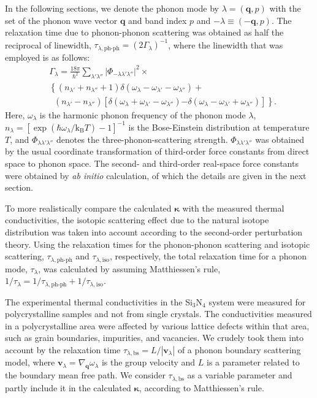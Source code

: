 \documentclass[twocolumn,amsmath,amssymb,a4paper,prb,superscriptaddress,floatfix]{revtex4-1}
\begin{document}
In the following sections, we denote the phonon mode by $\lambda=(\mathbf{q},p)$
with the set of the phonon wave vector $\mathbf{q}$ and band index $p$ and
$-\lambda \equiv (-\mathbf{q},p)$. The relaxation time due to phonon-phonon
scattering was obtained as half the reciprocal of linewidth,
$\tau_{\lambda,\text{ph-ph}}=(2\Gamma_\lambda)^{-1}$, where the linewidth that was
employed is as follows:
\begin{align}
 \label{eq:linewidth}
 &\Gamma_\lambda = \frac{18\pi}{\hbar^2}
  \sum_{\lambda' \lambda''}
  \bigl|\Phi_{-\lambda\lambda'\lambda''}\bigl|^2 \times \nonumber \\ 
 &\left\{ (n_{\lambda'} + n_{\lambda''}+1) 
   \delta(\omega_\lambda-\omega_{\lambda'}-\omega_{\lambda''}) \right.
   + \nonumber \\ 
 &\;\;(n_{\lambda'}-n_{\lambda''})
  \left[\delta(\omega_\lambda +\omega_{\lambda'}-\omega_{\lambda''})
 \right. 
 \left. -\left. \delta(\omega_\lambda - \omega_{\lambda'}+\omega_{\lambda''})
 \right]\right\}.
\end{align}
Here, $\omega_\lambda$ is the harmonic phonon frequency of the phonon mode
$\lambda$, $n_\lambda=[\exp(\hbar\omega_\lambda/\mathrm{k_B}T)-1]^{-1}$ is
the Bose-Einstein distribution at temperature $T$, and
$\Phi_{\lambda\lambda'\lambda''}$ denotes the three-phonon-scattering strength.
$\Phi_{\lambda\lambda'\lambda''}$ was obtained by the usual coordinate
transformation of third-order force constants from direct space to phonon
space.\cite{phono3py} The second- and third-order real-space force constants
were obtained by {\it ab initio} calculation, of which the details are given in the
next section.

To more realistically compare the  calculated $\boldsymbol{\kappa}$ with the
measured thermal conductivities, the isotopic scattering effect due to the natural isotope
distribution was taken into account according to the second-order perturbation
theory.\cite{tamura} Using the relaxation times for the phonon-phonon scattering
and isotopic scattering, $\tau_{\lambda,\text{ph-ph}}$ and
$\tau_{\lambda,\text{iso}}$, respectively, the total relaxation time for a phonon mode,
$\tau_{\lambda}$, was calculated by assuming Matthiessen's rule, 
$1/\tau_{\lambda} = 1/\tau_{\lambda,\text{ph-ph}} +
1/\tau_{\lambda,\text{iso}}$.

The experimental thermal conductivities in the Si$_3$N$_4$ system were
measured for polycrystalline samples and not from single
crystals. The conductivities measured in a polycrystalline area were affected
by various lattice defects within that area, such as grain boundaries, impurities, and
vacancies. We crudely took them into account by the relaxation time
$\tau_{\lambda,\text{bs}}=L/|\mathbf{v}_\lambda|$ of a phonon boundary
scattering model, where $\mathbf{v}_\lambda = \nabla_{\mathbf{q}}\omega_\lambda$
is the group velocity and $L$ is a parameter related to the boundary mean free
path. We consider $\tau_{\lambda,\text{bs}}$ as a variable parameter and partly
include it in the calculated $\boldsymbol{\kappa}$, according to Matthiessen's rule. 
\end{document}
